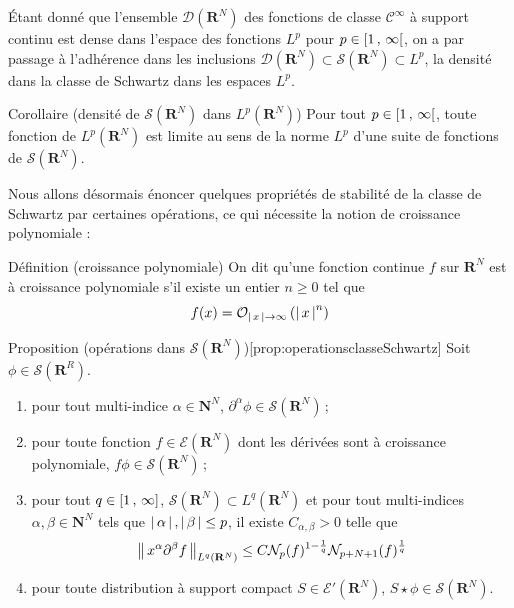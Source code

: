         Étant donné que l’ensemble $\mathcal{D}(\mathbf{R}^N)$ des fonctions de classe $\mathcal{C}^{\infty}$ à support continu est dense dans l’espace des fonctions $L^p$ pour $p \in \left[ 1 \, , \, \infty \right[$, on a par passage à l’adhérence dans les inclusions $\mathcal{D}(\mathbf{R}^N) \subset \mathcal{S}(\mathbf{R}^N) \subset L^p$, la densité dans la classe de Schwartz dans les espaces $L^p$.

        \begin{omed}{Corollaire (densité de $\mathcal{S}(\mathbf{R}^N)$ dans $L^p(\mathbf{R}^N)$)}
            Pour tout $p \in \left[ 1 \, , \, \infty \right[$, toute fonction de $L^p(\mathbf{R}^N)$ est limite au sens de la norme $L^p$ d’une suite de fonctions de $\mathcal{S}(\mathbf{R}^N)$.
        \end{omed}

        Nous allons désormais énoncer quelques propriétés de stabilité de la classe de Schwartz par certaines opérations, ce qui nécessite la notion de croissance polynomiale :

        \begin{omed}{Définition (croissance polynomiale)}
            On dit qu’une fonction continue $f$ sur $\mathbf{R}^N$ est à croissance polynomiale s’il existe un entier $n \geq 0$ tel que 
            \[ f(x) = \mathcal{O}_{\left\lvert \, x \, \right\rvert \to \infty} \left(\left\lvert \, x \, \right\rvert^n\right) \]   
        \end{omed}

        \begin{omed}{Proposition (opérations dans $\mathcal{S}(\mathbf{R}^N)$)}[prop:operationsclasseSchwartz]
            Soit $\phi \in \mathcal{S}(\mathbf{R}^R)$. 
            \begin{enumerate}[label=($p_{\arabic*}$)]
                \item pour tout multi-indice $\alpha \in \mathbf{N}^N$, $\partial^{\alpha}\phi \in \mathcal{S}(\mathbf{R}^N)$ ;
                \item pour toute fonction $f \in \mathcal{E}(\mathbf{R}^N)$ dont les dérivées sont à croissance polynomiale, $f\phi \in \mathcal{S}(\mathbf{R}^N)$ ;
                \item pour tout $q \in \left[ 1 \, , \, \infty \right]$, $\mathcal{S}(\mathbf{R}^N) \subset L^q(\mathbf{R}^N)$ et pour tout multi-indices $\alpha, \beta \in \mathbf{N}^N$ tels que $\left\lvert \, \alpha \, \right\rvert, \left\lvert \, \beta \, \right\rvert \leq p$, il existe $C_{\alpha,\beta} > 0$ telle que  
                \[ \left\lVert \, x^{\alpha} \partial^{\beta} f \, \right\rVert_{L^q(\mathbf{R}^N)} \leq C \mathcal{N}_p(f)^{1 - \frac{1}{q}} \mathcal{N}_{p + N + 1}(f)^{\frac{1}{q}} \]
                \item pour toute distribution à support compact $S \in \mathcal{E}'(\mathbf{R}^N)$, $S \star \phi \in \mathcal{S}(\mathbf{R}^N)$.
            \end{enumerate}
        \end{omed}

